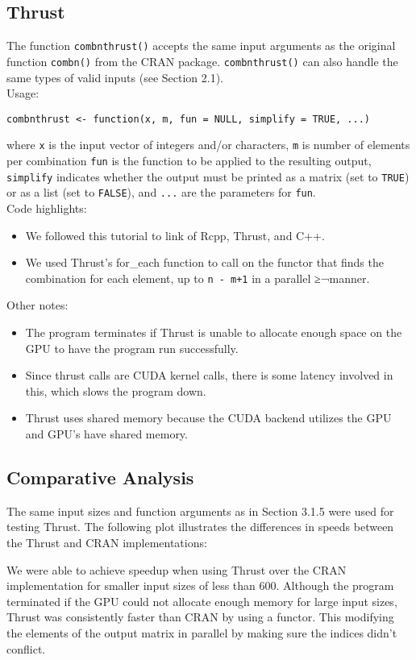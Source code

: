 \subsection{Thrust}

The function \texttt{combnthrust()} accepts the same input arguments as the original function \texttt{combn()} from the CRAN package. \texttt{combnthrust()} can also handle the same types of valid inputs (see Section 2.1).\\
\null
Usage:\\
\null

\texttt{combnthrust <- function(x, m, fun = NULL, simplify = TRUE, ...)}\\
\null

where \texttt{x} is the input vector of integers and/or characters, \texttt{m} is number of elements per combination
\texttt{fun} is the function to be applied to the resulting output, \texttt{simplify} indicates whether the output must be printed as a matrix (set to \texttt{TRUE}) or as a list (set to \texttt{FALSE}), and \texttt{...} are the parameters for \texttt{fun}.\\

\null
Code highlights:\\
\begin{itemize}
\item We followed this tutorial \cite{matlofftutorial} to link of Rcpp, Thrust, and C++.
\item We used Thrust's  for\_each function to call on the functor that finds the combination for each element, up to \texttt{n - m+1} in a parallel ≥¬manner. 
\end{itemize}
Other notes:
\begin{itemize}
\item The program terminates if Thrust is unable to allocate enough space on the GPU to have the program run successfully. 
\item Since thrust calls are CUDA kernel calls, there is some latency involved in this, which slows the program down. 
\item Thrust uses shared memory because the CUDA backend utilizes the GPU and GPU's have shared memory. 
\end{itemize}




\subsection{Comparative Analysis}
The same input sizes and function arguments as in Section 3.1.5 were used for testing Thrust. The following plot illustrates the differences in speeds between the Thrust and CRAN implementations:\\
\null

We were able to achieve speedup when using Thrust over the CRAN implementation for smaller input sizes of less than 600. Although the program terminated if the GPU could not allocate enough memory for large input sizes, Thrust was consistently faster than CRAN by using a functor. This modifying the elements of the output matrix in parallel by making sure the indices didn't conflict. 
